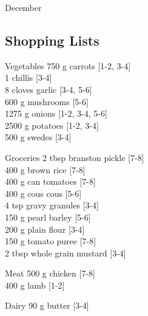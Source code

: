 \begin{menu}{December}
    \subsection*{Shopping Lists}
      \begin{shoppinglist}{Vegetables}
      750 g carrots 
        {\scriptsize[1-2, 3-4]}\\
      1  chillis 
        {\scriptsize[3-4]}\\
      8 cloves garlic 
        {\scriptsize[3-4, 5-6]}\\
      600 g mushrooms 
        {\scriptsize[5-6]}\\
      1275 g onions 
        {\scriptsize[1-2, 3-4, 5-6]}\\
      2500 g potatoes 
        {\scriptsize[1-2, 3-4]}\\
      500 g swedes 
        {\scriptsize[3-4]}\\
      \end{shoppinglist}%
      \begin{shoppinglist}{Groceries}
      2 tbsp branston pickle 
        {\scriptsize[7-8]}\\
      400 g brown rice 
        {\scriptsize[7-8]}\\
      400 g can tomatoes 
        {\scriptsize[7-8]}\\
      400 g cous cous 
        {\scriptsize[5-6]}\\
      4 tsp gravy granules 
        {\scriptsize[3-4]}\\
      150 g pearl barley 
        {\scriptsize[5-6]}\\
      200 g plain flour 
        {\scriptsize[3-4]}\\
      150 g tomato puree 
        {\scriptsize[7-8]}\\
      2 tbsp whole grain mustard 
        {\scriptsize[3-4]}\\
      \end{shoppinglist}%
      \par\vfil %
      \begin{shoppinglist}{Meat}
      500 g chicken 
        {\scriptsize[7-8]}\\
      400 g lamb 
        {\scriptsize[1-2]}\\
      \end{shoppinglist}%
      \begin{shoppinglist}{Dairy}
      90 g butter 
        {\scriptsize[3-4]}\\

\end{shoppinglist}
\end{menu}
